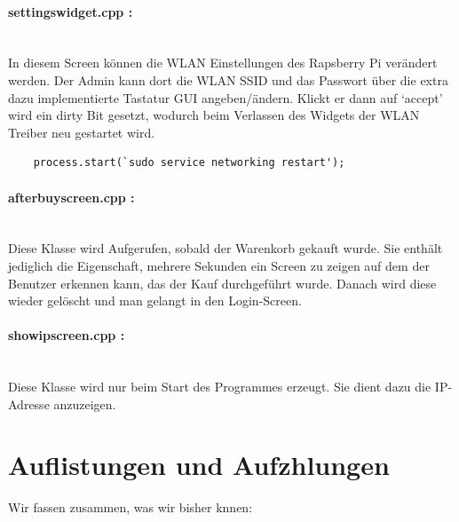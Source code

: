 \documentclass[11pt,a4paper]{article} %
\begin{document}
\paragraph{settingswidget.cpp :} $\;$ \\
	In diesem Screen können die WLAN Einstellungen des Rapsberry Pi verändert werden. Der Admin kann dort die WLAN SSID und das Passwort über die extra dazu implementierte Tastatur GUI angeben/ändern.
	Klickt er dann auf `accept' wird ein dirty Bit gesetzt, wodurch beim Verlassen des Widgets der WLAN Treiber neu gestartet wird. 
	\begin{frame}

\begin{lstlisting}
	process.start(`sudo service networking restart');
	\end{lstlisting}
\end{frame}
\par	
\paragraph{afterbuyscreen.cpp :} $\;$ \\
	Diese Klasse wird Aufgerufen, sobald der Warenkorb gekauft wurde. Sie enthält jediglich die Eigenschaft, mehrere Sekunden ein Screen zu zeigen auf dem der Benutzer erkennen kann, das der Kauf durchgeführt wurde.
	Danach wird diese wieder gelöscht und man gelangt in den Login-Screen.

\paragraph{showipscreen.cpp :} $\;$ \\
		Diese Klasse wird nur beim Start des Programmes erzeugt. Sie dient dazu die IP-Adresse anzuzeigen.



\section{Auflistungen und Aufzhlungen}
\label{Listen}

Wir fassen zusammen, was wir bisher knnen:
\end{document}
